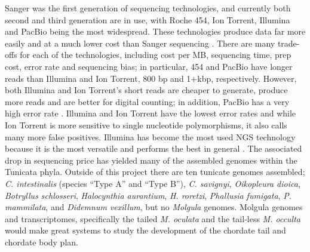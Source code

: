 Sanger was the first generation of sequencing technologies, and currently both second and third generation are in use, with Roche 454, Ion Torrent, Illumina and PacBio being the most widespread. These technologies produce data far more easily and at a much lower cost than Sanger sequencing \cite{metzker_emerging_2005}. There are many trade-offs for each of the technologies, including cost per MB, sequencing time, prep cost, error rate and sequencing bias; in particular, 454 and PacBio have longer reads than Illumina and Ion Torrent, 800 bp and 1+kbp, respectively. However, both Illumina and Ion Torrent's short reads are cheaper to generate, produce more reads and are better for digital counting; in addition, PacBio has a very high error rate \cite{glenn_field_2011}. Illumina and Ion Torrent have the lowest error rates and while Ion Torrent is more sensitive to single nucleotide polymorphisms, it also calls many more false positives.  Illumina has become the most used NGS technology because it is the most versatile and performs the best in general \cite{quail_tale_2012}. The associated drop in sequencing price has yielded many of the assembled genomes within the Tunicata phyla. Outside of this project there are ten tunicate genomes assembled; \textit{C. intestinalis} (species ``Type A'' and ``Type B''), \textit{C. savignyi}, \textit{Oikopleura dioica}, \textit{Botryllus schlosseri}, \textit{Halocynthia aurantium}, \textit{H. roretzi}, \textit{Phallusia fumigata}, \textit{P. mammilata}, and \textit{Didemnum vexillum}, but no \textit{Molgula} genomes. Molgula genomes and transcriptomes, specifically the tailed \textit{M. oculata} and the tail-less \textit{M. occulta} would make great systems to study the development of the chordate tail and chordate body plan. 
